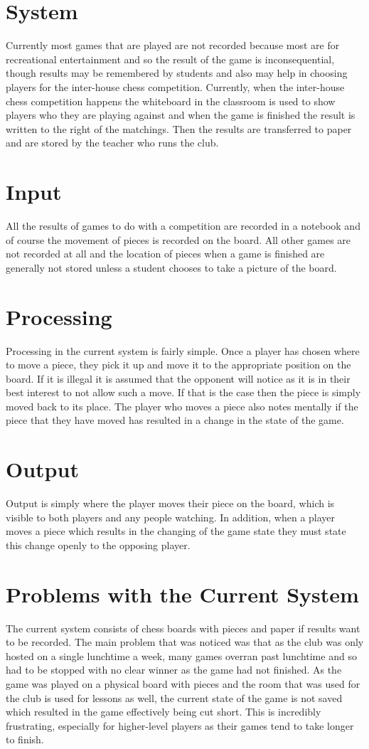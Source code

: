 \documentclass[]{report}
\begin{document}
\section{System}
Currently most games that are played are not recorded because most are for recreational entertainment and so the result of the game is inconsequential, though results may be remembered by students and also may help in choosing players for the inter-house chess competition. Currently, when the inter-house chess competition happens the whiteboard in the classroom is used to show players who they are playing against and when the game is finished the result is written to the right of the matchings. Then the results are transferred to paper and are stored by the teacher who runs the club.
\section{Input}
All the results of games to do with a competition are recorded in a notebook and of course the movement of pieces is recorded on the board. All other games are not recorded at all and the location of pieces when a game is finished are generally not stored unless a student chooses to take a picture of the board.
\section{Processing}
Processing in the current system is fairly simple. Once a player has chosen where to move a piece, they pick it up and move it to the appropriate position on the board. If it is illegal it is assumed that the opponent will notice as it is in their best interest to not allow such a move. If that is the case then the piece is simply moved back to its place. The player who moves a piece also notes mentally if the piece that they have moved has resulted in a change in the state of the game.
\section{Output}
Output is simply where the player moves their piece on the board, which is visible to both players and any people watching. In addition, when a player moves a piece which results in the changing of the game state they must state this change openly to the opposing player.
\section{Problems with the Current System}
The current system consists of chess boards with pieces and paper if results want to be recorded. The main problem that was noticed was that as the club was only hosted on a single lunchtime a week, many games overran past lunchtime and so had to be stopped with no clear winner as the game had not finished. As the game was played on a physical board with pieces and the room that was used for the club is used for lessons as well, the current state of the game is not saved which resulted in the game effectively being cut short. This is incredibly frustrating, especially for higher-level players as their games tend to take longer to finish. 
\end{document}
